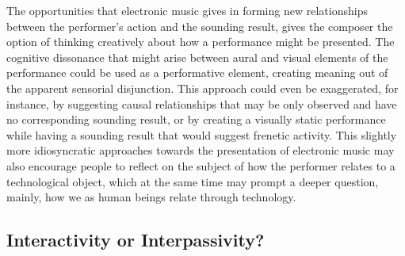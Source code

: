 The opportunities that electronic music gives in forming new relationships between the performer's action and the sounding result, gives the composer the option of thinking creatively about how a performance might be presented. The cognitive dissonance that might arise between aural and visual elements of the performance could be used as a performative element, creating meaning out of the apparent sensorial disjunction. This approach could even be exaggerated, for instance, by suggesting causal relationships that may be only observed and have no corresponding sounding result, or by creating a visually static performance while having a sounding result that would suggest frenetic activity. This slightly more idiosyncratic approaches towards the presentation of electronic music may also encourage people to reflect on the subject of how the performer relates to a technological object, which at the same time may prompt a deeper question, mainly, how we as human beings relate through technology.

\subsection{Interactivity or Interpassivity?}
 
